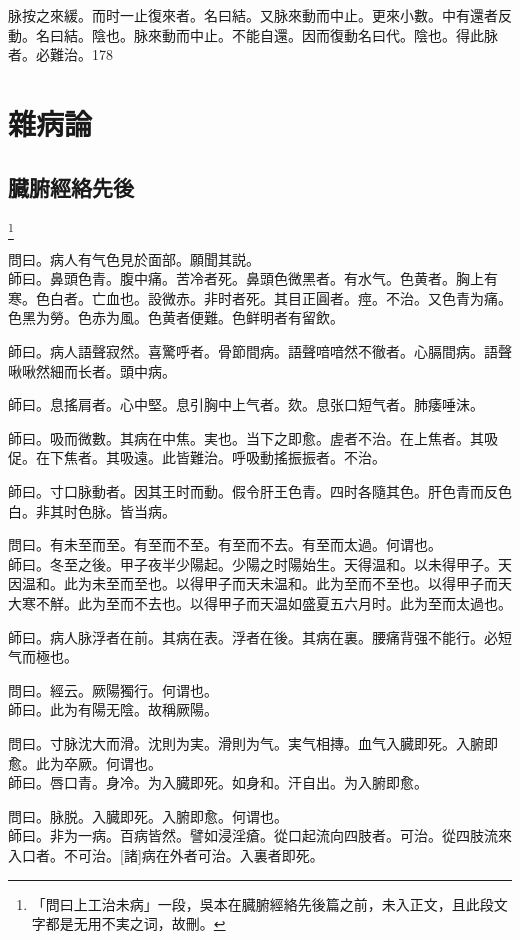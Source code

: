 \documentclass[12pt,twoside,UTF8,b5paper]{ctexbook}
\begin{document}
脉按之來緩。而时一止復來者。名曰結。又脉來動而中止。更來小數。中有還者反動。名曰結。陰也。脉來動而中止。不能自還。因而復動名曰代。陰也。得此脉者。必難治。178

\part{雜病論}

\chapter{臓腑經絡先後}

	\footnote{「問曰上工治未病」一段，吳本在臓腑經絡先後篇之前，未入正文，且此段文字都是无用不実之词，故刪。}

問曰。病人有气色見於面部。願聞其説。\\
師曰。鼻頭色青。腹中痛。苦冷者死。鼻頭色微黑者。有水气。色黄者。胸上有寒。色白者。亡血也。設微赤。非时者死。其目正圓者。痙。不治。又色青为痛。色黑为勞。色赤为風。色黄者便難。色鲜明者有留飲。

師曰。病人語聲寂然。喜驚呼者。骨節間病。語聲喑喑然不徹者。心膈間病。語聲啾啾然細而长者。頭中病。

師曰。息搖肩者。心中堅。息引胸中上气者。欬。息张口短气者。肺痿唾沫。

師曰。吸而微數。其病在中焦。実也。当下之即愈。虗者不治。在上焦者。其吸促。在下焦者。其吸遠。此皆難治。呼吸動搖振振者。不治。

師曰。寸口脉動者。因其王时而動。假令肝王色青。四时各隨其色。肝色青而反色白。非其时色脉。皆当病。

問曰。有未至而至。有至而不至。有至而不去。有至而太過。何谓也。\\
師曰。冬至之後。甲子夜半少陽起。少陽之时陽始生。天得温和。以未得甲子。天因温和。此为未至而至也。以得甲子而天未温和。此为至而不至也。以得甲子而天大寒不觧。此为至而不去也。以得甲子而天温如盛夏五六月时。此为至而太過也。

師曰。病人脉浮者在前。其病在表。浮者在後。其病在裏。腰痛背强不能行。必短气而極也。

問曰。經云。厥陽獨行。何谓也。\\
師曰。此为有陽无陰。故稱厥陽。

問曰。寸脉沈大而滑。沈則为実。滑則为气。実气相摶。血气入臓即死。入腑即愈。此为卒厥。何谓也。\\
師曰。唇口青。身冷。为入臓即死。如身和。汗自出。为入腑即愈。

問曰。脉脱。入臓即死。入腑即愈。何谓也。\\
師曰。非为一病。百病皆然。譬如浸淫瘡。從口起流向四肢者。可治。從四肢流來入口者。不可治。[諸]病在外者可治。入裏者即死。
\end{document}
